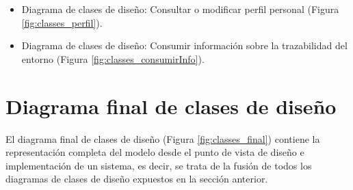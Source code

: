 \documentclass[12pt,a4paper, twoside]{report}
\begin{document}
\begin{itemize}
			
		\item Diagrama de clases de diseño: Consultar o modificar perfil personal (Figura \ref{fig:classes_perfil}).
		
		
		\newpage
		
		\item Diagrama de clases de diseño: Consumir información sobre la trazabilidad del entorno (Figura \ref{fig:classes_consumirInfo}).
		
		
	\end{itemize}
		
	\section{Diagrama final de clases de diseño}	
	
	El diagrama final de clases de diseño (Figura \ref{fig:classes_final}) contiene la representación completa del modelo desde el punto de vista de diseño e implementación de un sistema, es decir, se trata de la fusión de todos los diagramas de clases de diseño expuestos en la sección anterior.
\end{document}
